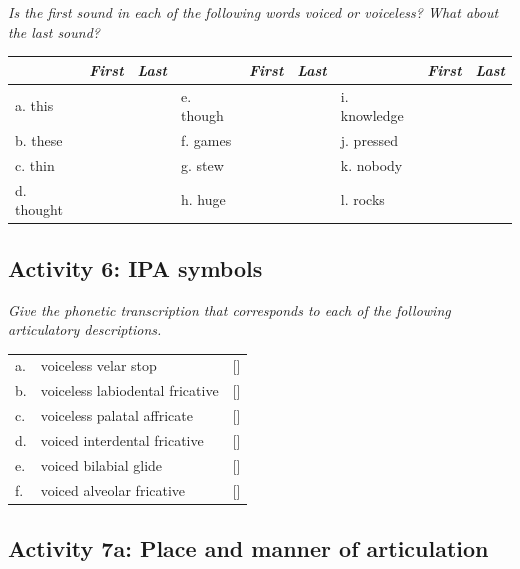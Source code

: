 \documentclass[11pt, oneside]{article}   	%
\begin{document}
{\itshape Is the first sound in each of the following words voiced or voiceless? What about the last sound?}

\begin{center}
\begin{tabular}{ l | p{1cm} | p{1cm} || l | p{1cm} | p{1cm} || l | p{1cm} | p{1cm}}
	& {\itshape First} & {\itshape Last} &		&	{\itshape First} & {\itshape Last} &	& {\itshape First} & {\itshape Last} \\ \hline
a. this & 	&	& e. though &	&	& i. knowledge &		& 	\\ \hline
b. these & 	&	& f. games &	&	& j. pressed &		& 	\\ \hline
c. thin  & 	&	& g. stew &	&	& k. nobody &		& 	\\ \hline
d. thought & 	&	& h. huge &	&	& l. rocks &		& 	\\ \hline
\end{tabular}
\end{center}

\subsection{Activity 6: IPA symbols}

{\itshape Give the phonetic transcription that corresponds to each of the following articulatory descriptions.}

\begin{center}
\begin{tabular}{ l l l }
a.	&	 voiceless velar stop	& [\hspace{2cm}] \\
b.	&	voiceless labiodental fricative & [\hspace{2cm}] \\
c.	&	voiceless palatal affricate	& [\hspace{2cm}] \\
d.	&	voiced interdental fricative	 & [\hspace{2cm}] \\
e.	&	voiced bilabial glide	&	[\hspace{2cm}] \\
f.	&	voiced alveolar fricative	&	[\hspace{2cm}] \\
\end{tabular}
\end{center}

\subsection{Activity 7a: Place and manner of articulation}
\end{document}
